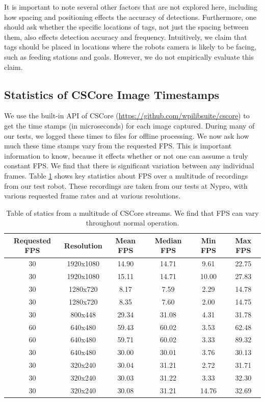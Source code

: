 \documentclass{article}
\begin{document}
    It is important to note several other factors that are not explored here, including how spacing and positioning effects the accuracy of detections. Furthermore, one should ask whether the specific locations of tags, not just the spacing between them, also effects detection accuracy and frequency. Intuitively, we claim that tags should be placed in locations where the robots camera is likely to be facing, such as feeding stations and goals. However, we do not empirically evaluate this claim.

	\subsection{Statistics of CSCore Image Timestamps}

    We use the built-in API of CSCore (\url{https://github.com/wpilibsuite/cscore}) to get the time stamps (in microseconds) for each image captured. During many of our tests, we logged these times to files for offline processing. We now ask how much these time stamps vary from the requested FPS. This is important information to know, because it effects whether or not one can assume a truly constant FPS. We find that there is significant variation between any individual frames. Table \ref{table:fps_stats} shows key statistics about FPS over a multitude of recordings from our test robot. These recordings are taken from our tests at Nypro, with various requested frame rates and at various resolutions.

    \begin{table}[H]
      \centering
      \begin{tabular}{|c|c|c|c|c|c|} \hline
        Requested FPS & Resolution & Mean FPS & Median FPS & Min FPS & Max FPS \\ \hline
        30 & 1920x1080 & 14.90 & 14.71 & 9.61 & 22.75 \\ \hline
        30 & 1920x1080 & 15.11 & 14.71 & 10.00 & 27.83 \\ \hline
        30 & 1280x720 & 8.17 & 7.59 & 2.29 & 14.78 \\ \hline
        30 & 1280x720 & 8.35 & 7.60 & 2.00 & 14.75 \\ \hline
        30 & 800x448 & 29.34 & 31.08  & 4.31 & 31.78 \\ \hline
        60 & 640x480 & 59.43 & 60.02 & 3.53 & 62.48 \\ \hline
        60 & 640x480 & 59.71 & 60.02 & 3.33 & 89.32 \\ \hline
        30 & 640x480 & 30.00 & 30.01 & 3.76 & 30.13 \\ \hline
        30 & 320x240 & 30.04 & 31.21 & 2.72 & 31.71 \\ \hline
        30 & 320x240 & 30.03 & 31.22 & 3.33 & 32.30 \\ \hline
        30 & 320x240 & 30.08 & 31.21 & 14.76 & 32.69 \\ \hline
      \end{tabular}
      \caption{Table of statics from a multitude of CSCore streams. We find that FPS can vary throughout normal operation.}
      \label{table:fps_stats}
    \end{table}
\end{document}
